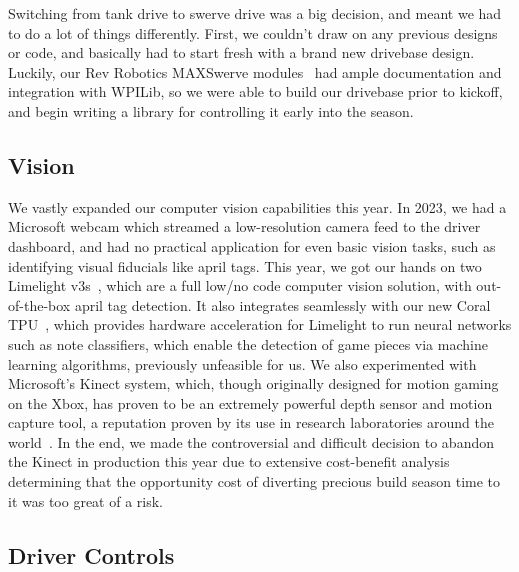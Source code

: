 Switching from tank drive to swerve drive was a big decision, and meant
we had to do a lot of things differently. First, we couldn't draw on any
previous designs or code, and basically had to start fresh with a brand
new drivebase design. Luckily, our Rev Robotics MAXSwerve
modules~\cite{revswervemodule} had ample documentation and integration
with WPILib, so we were able to build our drivebase prior to kickoff,
and begin writing a library for controlling it early into the season.



\subsection{Vision}

We vastly expanded our computer vision capabilities this year. In
2023, we had a Microsoft webcam which streamed a low-resolution camera
feed to the driver dashboard, and had no practical application for even
basic vision tasks, such as identifying visual fiducials like april
tags. This year, we got our hands on two Limelight v3s~\cite{limelight},
which are a full low/no code computer vision solution, with
out-of-the-box april tag detection. It also integrates seamlessly with
our new Coral TPU~\cite{coral}, which provides hardware acceleration for
Limelight to run neural networks such as note classifiers, which enable
the detection of game pieces via machine learning algorithms, previously
unfeasible for us. We also experimented with Microsoft's Kinect system,
which, though originally designed for motion gaming on the Xbox, has
proven to be an extremely powerful depth sensor and motion capture tool,
a reputation proven by its use in research laboratories around the
world~\cite{kinectpaper}. In the end, we made the controversial and
difficult decision to abandon the Kinect in production this year due to
extensive cost-benefit analysis determining that the opportunity cost of
diverting precious build season time to it was too great of a risk.\@


\subsection{Driver Controls}

